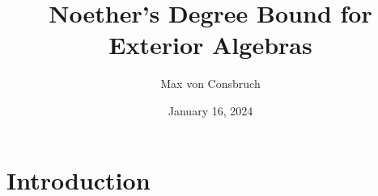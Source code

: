 \documentclass[a4paper,11pt]{article}
\title{Noether's Degree Bound for Exterior Algebras}
\author{Max von Consbruch}
\date{January 16, 2024}
\begin{document}
\maketitle

\section{Introduction}






{}
\end{document}
